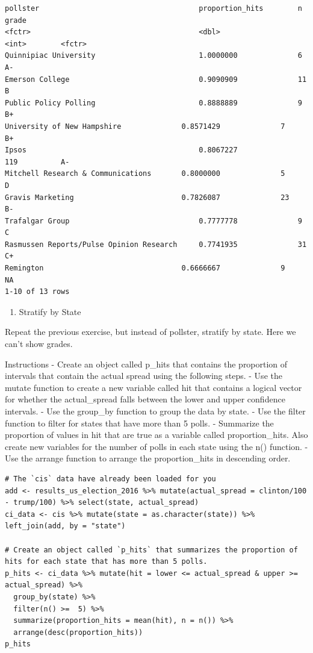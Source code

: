 \documentclass[
]{article}
\providecommand{\tightlist}{%
  \setlength{\itemsep}{0pt}\setlength{\parskip}{0pt}}
\begin{document}
\begin{verbatim}
pollster                                     proportion_hits        n            grade
<fctr>                                       <dbl>                  <int>        <fctr>
Quinnipiac University                        1.0000000              6            A-
Emerson College                              0.9090909              11           B
Public Policy Polling                        0.8888889              9            B+
University of New Hampshire              0.8571429              7            B+
Ipsos                                        0.8067227              119          A-
Mitchell Research & Communications       0.8000000              5            D
Gravis Marketing                         0.7826087              23           B-
Trafalgar Group                              0.7777778              9            C
Rasmussen Reports/Pulse Opinion Research     0.7741935              31           C+
Remington                                0.6666667              9            NA
1-10 of 13 rows
\end{verbatim}

\begin{enumerate}
\def\labelenumi{\arabic{enumi}.}
\setcounter{enumi}{3}
\tightlist
\item
  Stratify by State
\end{enumerate}

Repeat the previous exercise, but instead of pollster, stratify by
state. Here we can't show grades.

Instructions - Create an object called p\_hits that contains the
proportion of intervals that contain the actual spread using the
following steps. - Use the mutate function to create a new variable
called hit that contains a logical vector for whether the actual\_spread
falls between the lower and upper confidence intervals. - Use the
group\_by function to group the data by state. - Use the filter function
to filter for states that have more than 5 polls. - Summarize the
proportion of values in hit that are true as a variable called
proportion\_hits. Also create new variables for the number of polls in
each state using the n() function. - Use the arrange function to arrange
the proportion\_hits in descending order.

\begin{verbatim}
# The `cis` data have already been loaded for you
add <- results_us_election_2016 %>% mutate(actual_spread = clinton/100 - trump/100) %>% select(state, actual_spread)
ci_data <- cis %>% mutate(state = as.character(state)) %>% left_join(add, by = "state")

# Create an object called `p_hits` that summarizes the proportion of hits for each state that has more than 5 polls. 
p_hits <- ci_data %>% mutate(hit = lower <= actual_spread & upper >= actual_spread) %>% 
  group_by(state) %>%
  filter(n() >=  5) %>%
  summarize(proportion_hits = mean(hit), n = n()) %>%
  arrange(desc(proportion_hits)) 
p_hits
\end{verbatim}
\end{document}
